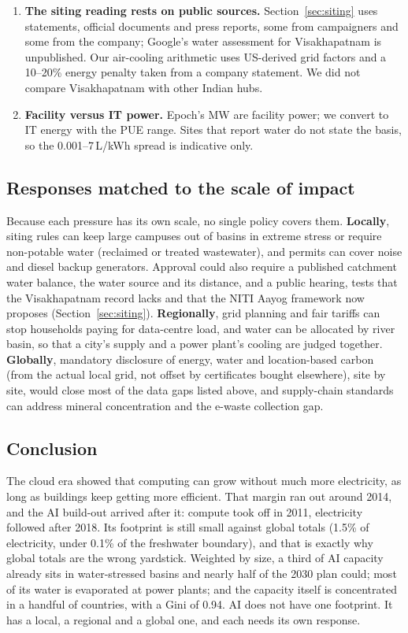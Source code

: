 \begin{enumerate}[leftmargin=1.3em,itemsep=1.5pt]
published values, not a series we fitted, so it has no interval; the US rates are those stated by LBNL. Masanet et al.'s
+6\% is taken from the LBNL summary of the paper.
\item \textbf{The siting reading rests on public sources.} Section~\ref{sec:siting} uses statements, official documents and press reports,
some from campaigners and some from the company; Google's water assessment for Visakhapatnam is unpublished. Our air-cooling arithmetic uses
US-derived grid factors and a 10--20\% energy penalty taken from a company statement. We did not compare Visakhapatnam with other Indian hubs.
\item \textbf{Facility versus IT power.} Epoch's MW are facility power; we convert to IT energy with the PUE range. Sites
that report water do not state the basis, so the 0.001--7\,L/kWh spread is indicative only.
\end{enumerate}

\subsection{Responses matched to the scale of impact}\label{sec:responses}
Because each pressure has its own scale, no single policy covers them.
\textbf{Locally}, siting rules can keep large campuses out of basins in extreme stress or require non-potable water
(reclaimed or treated wastewater), and permits can cover noise and diesel backup generators. Approval could also require a
published catchment water balance, the water source and its distance, and a public hearing, tests that the Visakhapatnam record
lacks and that the NITI Aayog framework now proposes (Section~\ref{sec:siting}).
\textbf{Regionally}, grid planning and fair tariffs can stop households paying for data-centre load, and water can be
allocated by river basin, so that a city's supply and a power plant's cooling are judged together.
\textbf{Globally}, mandatory disclosure of energy, water and location-based carbon (from the actual local grid, not
offset by certificates bought elsewhere), site by site, would close most of the data gaps listed above, and
supply-chain standards can address mineral concentration and the e-waste collection gap.

\subsection{Conclusion}
The cloud era showed that computing can grow without much more electricity, as long as buildings keep getting more
efficient. That margin ran out around 2014, and the AI build-out arrived after it: compute took off in 2011, electricity
followed after 2018. Its footprint is still small against global totals (1.5\% of electricity, under 0.1\% of the
freshwater boundary), and that is exactly why global totals are the wrong yardstick. Weighted by size, a third of AI
capacity already sits in water-stressed basins and nearly half of the 2030 plan could; most of its water is evaporated
at power plants; and the capacity itself is concentrated in a handful of countries, with a Gini of 0.94. AI does not
have one footprint. It has a local, a regional and a global one, and each needs its own response.
